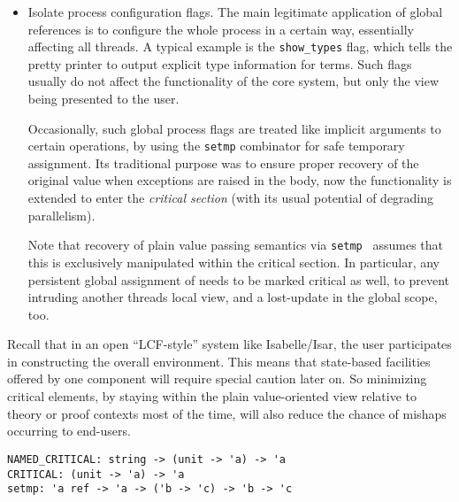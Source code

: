 \begin{isabellebody}
\begin{isamarkuptext}
\begin{itemize}
  \item Isolate process configuration flags.  The main legitimate
  application of global references is to configure the whole process
  in a certain way, essentially affecting all threads.  A typical
  example is the \verb|show_types| flag, which tells the pretty printer
  to output explicit type information for terms.  Such flags usually
  do not affect the functionality of the core system, but only the
  view being presented to the user.

  Occasionally, such global process flags are treated like implicit
  arguments to certain operations, by using the \verb|setmp| combinator
  for safe temporary assignment.  Its traditional purpose was to
  ensure proper recovery of the original value when exceptions are
  raised in the body, now the functionality is extended to enter the
  \emph{critical section} (with its usual potential of degrading
  parallelism).

  Note that recovery of plain value passing semantics via \verb|setmp|~ assumes that this  is
  exclusively manipulated within the critical section.  In particular,
  any persistent global assignment of  needs to
  be marked critical as well, to prevent intruding another threads
  local view, and a lost-update in the global scope, too.

  \end{itemize}

  Recall that in an open ``LCF-style'' system like Isabelle/Isar, the
  user participates in constructing the overall environment.  This
  means that state-based facilities offered by one component will
  require special caution later on.  So minimizing critical elements,
  by staying within the plain value-oriented view relative to theory
  or proof contexts most of the time, will also reduce the chance of
  mishaps occurring to end-users.%
\end{isamarkuptext}%
\isamarkuptrue%
%
\isadelimmlref
%
\endisadelimmlref
%
\isatagmlref
%
\begin{isamarkuptext}%
\begin{mldecls}
  \verb|NAMED_CRITICAL: string -> (unit -> 'a) -> 'a| \\
  \verb|CRITICAL: (unit -> 'a) -> 'a| \\
  \verb|setmp: 'a ref -> 'a -> ('b -> 'c) -> 'b -> 'c| \\
  \end{mldecls}


\end{isamarkuptext}
\end{isabellebody}
